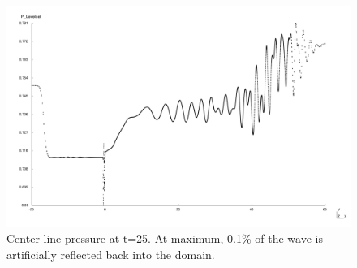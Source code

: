 \begin{figure}
  \centering
  \includegraphics[width=\textwidth]{./figs/lung_figs/p_centerline_t25}
  \caption{Center-line pressure at t=25. At maximum, 0.1\% of the wave
    is artificially reflected back into the domain.}
\end{figure}


